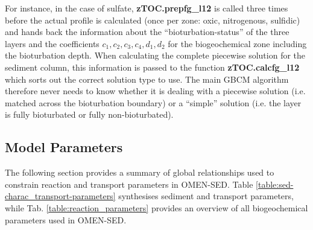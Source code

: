 \documentclass[gmd, manuscript]{copernicus}
\begin{document}
For instance, in the case of sulfate, \textsf{\textbf{zTOC.prepfg\_l12}} is called three times before the actual profile is calculated (once per zone: oxic, nitrogenous, sulfidic) 
and hands back the information about the ``bioturbation-status'' of the three layers and the coefficients $c_1, c_2, c_3, c_4, d_1, d_2$ for the biogeochemical zone including the bioturbation depth. 
When calculating the complete piecewise solution for the sediment column, this information is passed to the function \textsf{\textbf{zTOC.calcfg\_l12}} which sorts out the correct solution type to use. 
The main GBCM algorithm therefore never needs to know whether 
it is dealing with a piecewise solution (i.e. matched across the bioturbation boundary) or a ``simple'' solution (i.e. the layer is fully bioturbated or fully non-bioturbated). 


\subsection{Model Parameters}\label{subsec:ModelParameters}
The following section provides a summary of  global relationships used to constrain reaction and transport parameters in OMEN-SED. Table \ref{table:sed-charac_transport-parameters} 
synthesises sediment and transport parameters, while Tab. \ref{table:reaction_parameters} provides an overview of all biogeochemical parameters used in OMEN-SED.
\end{document}
